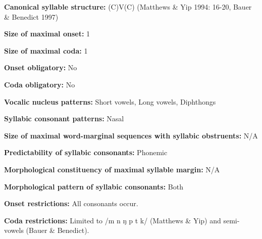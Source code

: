 \begin{styleBody}
\textbf{Canonical syllable structure:} (C)V(C)\textbf{ }(Matthews \& Yip 1994: 16-20, Bauer \& Benedict 1997)
\end{styleBody}

\begin{styleBody}
\textbf{Size of maximal onset:} 1
\end{styleBody}

\begin{styleBody}
\textbf{Size of maximal coda:} 1
\end{styleBody}

\begin{styleBody}
\textbf{Onset obligatory:} No
\end{styleBody}

\begin{styleBody}
\textbf{Coda obligatory:} No
\end{styleBody}

\begin{styleBody}
\textbf{Vocalic nucleus patterns:} Short vowels, Long vowels, Diphthongs
\end{styleBody}

\begin{styleBody}
\textbf{Syllabic consonant patterns:} Nasal
\end{styleBody}

\begin{styleBody}
\textbf{Size of maximal word{}-marginal sequences with syllabic obstruents:} N/A
\end{styleBody}

\begin{styleBody}
\textbf{Predictability of syllabic consonants:} Phonemic
\end{styleBody}

\begin{styleBody}
\textbf{Morphological constituency of maximal syllable margin:} N/A
\end{styleBody}

\begin{styleBody}
\textbf{Morphological pattern of syllabic consonants:} Both
\end{styleBody}

\begin{styleBody}
\textbf{Onset restrictions:} All consonants occur.
\end{styleBody}

\begin{styleBody}
\textbf{Coda restrictions:} Limited to /m n ŋ p t k/ (Matthews \& Yip) and semi-vowels (Bauer \& Benedict).
\end{styleBody}

